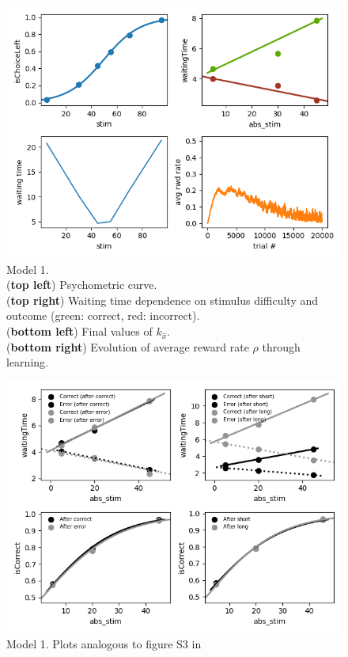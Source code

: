 \begin{figure}[t!]
    \centering
    \includegraphics[width=.6\linewidth]{dual2afc/myplot.png}
    \caption{Model 1.\\
    (\textbf{top left}) Psychometric curve. \\
    (\textbf{top right}) Waiting time dependence on stimulus difficulty and outcome (green: correct, red: incorrect). \\
    (\textbf{bottom left}) Final values of $ k_\hat{x} $. \\
    (\textbf{bottom right}) Evolution of average reward rate $\rho$ through learning.}
    \label{fig:mod1f3}
\end{figure}

\begin{figure}[h!]
    \centering
    \includegraphics[width=.6\linewidth]{dual2afc/myplot2.png}
    \caption{Model 1. Plots analogous to figure S3 in \cite{lak2014orbitofrontal}}
    \label{fig:mod1fs3}
\end{figure}